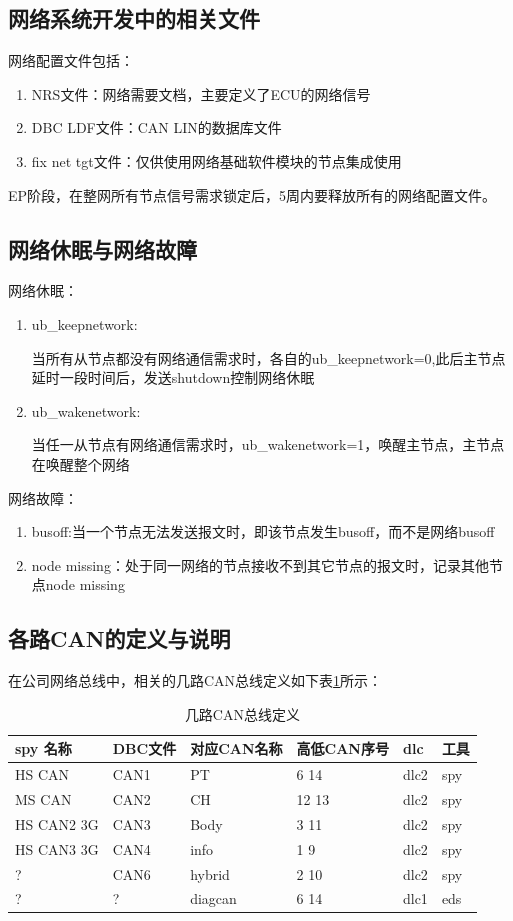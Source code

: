 \subsection{网络系统开发中的相关文件}
网络配置文件包括：
\begin{enumerate}
    \item NRS文件：网络需要文档，主要定义了ECU的网络信号
    \item DBC LDF文件：CAN LIN的数据库文件
    \item fix net tgt文件：仅供使用网络基础软件模块的节点集成使用
\end{enumerate}
EP阶段，在整网所有节点信号需求锁定后，5周内要释放所有的网络配置文件。

\subsection{网络休眠与网络故障}
网络休眠：
\begin{enumerate}
    \item ub\_keepnetwork:
    
    当所有从节点都没有网络通信需求时，各自的ub\_keepnetwork=0,此后主节点延时一段时间后，发送shutdown控制网络休眠
    \item ub\_wakenetwork:
    
    当任一从节点有网络通信需求时，ub\_wakenetwork=1，唤醒主节点，主节点在唤醒整个网络
\end{enumerate}

网络故障：
\begin{enumerate}
    \item busoff:当一个节点无法发送报文时，即该节点发生busoff，而不是网络busoff
    \item node missing：处于同一网络的节点接收不到其它节点的报文时，记录其他节点node missing
\end{enumerate}

\subsection{各路CAN的定义与说明}
在公司网络总线中，相关的几路CAN总线定义如下表\ref{tab:canbus_def}所示：
\begin{table}[htbp]
    \centering
    \caption{几路CAN总线定义}
      \begin{tabular}{llllll}
      \toprule
      spy 名称 & DBC文件 & 对应CAN名称 & 高低CAN序号 & dlc   & 工具 \\
      \midrule
      HS CAN & CAN1  & PT    & 6 14  & dlc2  & spy \\
      MS CAN & CAN2  & CH    & 12 13 & dlc2  & spy \\
      HS CAN2 3G & CAN3  & Body  & 3 11  & dlc2  & spy \\
      HS CAN3 3G & CAN4  & info  & 1 9   & dlc2  & spy \\
      ?     & CAN6  & hybrid & 2 10  & dlc2  & spy \\
      ?     & ?     & diagcan & 6 14  & dlc1  & eds \\
      \bottomrule
      \end{tabular}%
    \label{tab:canbus_def}%
  \end{table}%
    
